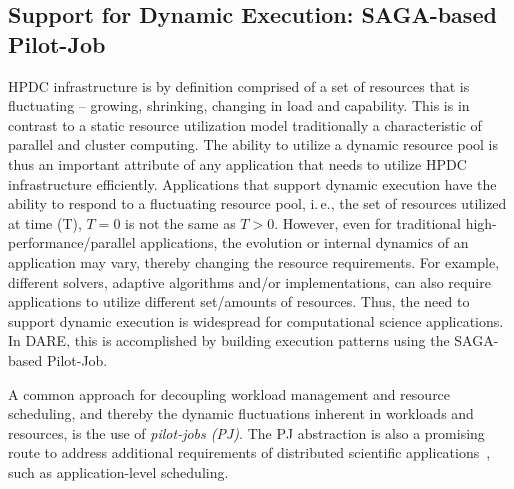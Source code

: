 \documentclass[]{svjour3}
\begin{document}

\subsection{Support for Dynamic Execution: SAGA-based Pilot-Job}

HPDC infrastructure is by definition comprised of a set of resources
that is fluctuating -- growing, shrinking, changing in load and
capability. This is in contrast to a static resource utilization model
traditionally a characteristic of parallel and cluster computing. The
ability to utilize a dynamic resource pool is thus an important
attribute of any application that needs to utilize HPDC infrastructure
efficiently. Applications that support dynamic execution have the
ability to respond to a fluctuating resource pool, i.\,e., the set of
resources utilized at time (T), $T=0$ is not the same as $T>0$.
However, even for traditional high-performance/parallel applications,
the evolution or internal dynamics of an application may vary, thereby
changing the resource requirements. For example, different solvers,
adaptive algorithms and/or implementations, can also require
applications to utilize different set/amounts of resources. Thus, the
need to support dynamic execution is widespread for computational
science applications. In DARE, this is accomplished by building
execution patterns using the SAGA-based Pilot-Job.
 
A common approach for decoupling workload management and resource
scheduling, and thereby the dynamic fluctuations inherent in workloads
and resources, is the use of \emph{pilot-jobs (PJ)}. The PJ
abstraction is also a promising route to address additional
requirements of distributed scientific
applications~\cite{ko-efficient,bigjob_cloudcom10}, such as
application-level scheduling.
 
\end{document}
